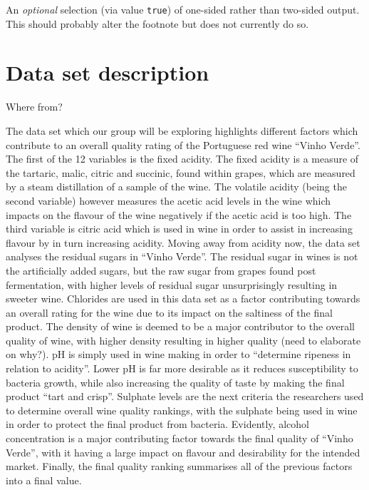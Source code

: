 \documentclass[letterpaper,9pt,twocolumn,twoside,]{pinp}
\begin{document}
An \emph{optional} selection (via value \texttt{true}) of one-sided
rather than two-sided output. This should probably alter the footnote
but does not currently do so.

\hypertarget{data-set-description}{%
\section{Data set description}\label{data-set-description}}

Where from?

The data set which our group will be exploring highlights different
factors which contribute to an overall quality rating of the Portuguese
red wine ``Vinho Verde''. The first of the 12 variables is the fixed
acidity. The fixed acidity is a measure of the tartaric, malic, citric
and succinic, found within grapes, which are measured by a steam
distillation of a sample of the wine. The volatile acidity (being the
second variable) however measures the acetic acid levels in the wine
which impacts on the flavour of the wine negatively if the acetic acid
is too high. The third variable is citric acid which is used in wine in
order to assist in increasing flavour by in turn increasing acidity.
Moving away from acidity now, the data set analyses the residual sugars
in ``Vinho Verde''. The residual sugar in wines is not the artificially
added sugars, but the raw sugar from grapes found post fermentation,
with higher levels of residual sugar unsurprisingly resulting in sweeter
wine. Chlorides are used in this data set as a factor contributing
towards an overall rating for the wine due to its impact on the
saltiness of the final product. The density of wine is deemed to be a
major contributor to the overall quality of wine, with higher density
resulting in higher quality (need to elaborate on why?). pH is simply
used in wine making in order to ``determine ripeness in relation to
acidity''. Lower pH is far more desirable as it reduces susceptibility
to bacteria growth, while also increasing the quality of taste by making
the final product ``tart and crisp''. Sulphate levels are the next
criteria the researchers used to determine overall wine quality
rankings, with the sulphate being used in wine in order to protect the
final product from bacteria. Evidently, alcohol concentration is a major
contributing factor towards the final quality of ``Vinho Verde'', with
it having a large impact on flavour and desirability for the intended
market. Finally, the final quality ranking summarises all of the
previous factors into a final value.
\end{document}

